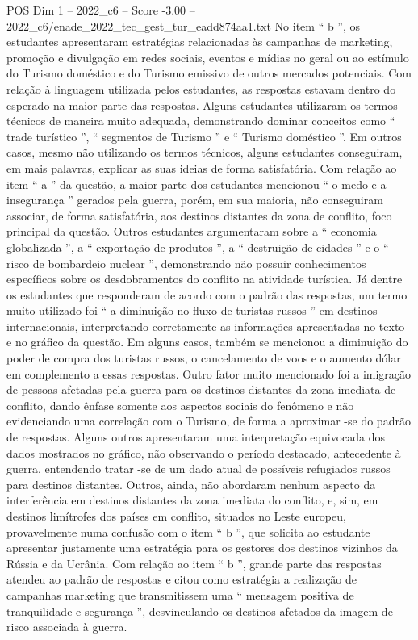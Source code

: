 \begin{textsample}{POS Dim 1 – 2022\_c6 – Score -3.00 – 2022\_c6/enade\_2022\_tec\_gest\_tur\_eadd874aa1.txt}
No item “ b ”, os estudantes apresentaram estratégias relacionadas às campanhas de marketing, promoção e divulgação em redes sociais, eventos e mídias no geral ou ao estímulo do Turismo doméstico e do Turismo emissivo de outros mercados potenciais.
Com relação à linguagem utilizada pelos estudantes, as respostas estavam dentro do esperado na maior parte das respostas.
Alguns estudantes utilizaram os termos técnicos de maneira muito adequada, demonstrando dominar conceitos como “ trade turístico ”, “ segmentos de Turismo ” e “ Turismo doméstico ”.
Em outros casos, mesmo não utilizando os termos técnicos, alguns estudantes conseguiram, em mais palavras, explicar as suas ideias de forma satisfatória.
Com relação ao item “ a ” da questão, a maior parte dos estudantes mencionou “ o medo e a insegurança ” gerados pela guerra, porém, em sua maioria, não conseguiram associar, de forma satisfatória, aos destinos distantes da zona de conflito, foco principal da questão.
Outros estudantes argumentaram sobre a “ economia globalizada ”, a “ exportação de produtos ”, a “ destruição de cidades ” e o “ risco de bombardeio nuclear ”, demonstrando não possuir conhecimentos específicos sobre os desdobramentos do conflito na atividade turística.
Já dentre os estudantes que responderam de acordo com o padrão das respostas, um termo muito utilizado foi “ a diminuição no fluxo de turistas russos ” em destinos internacionais, interpretando corretamente as informações apresentadas no texto e no gráfico da questão.
Em alguns casos, também se mencionou a diminuição do poder de compra dos turistas russos, o cancelamento de voos e o aumento dólar em complemento a essas respostas.
Outro fator muito mencionado foi a imigração de pessoas afetadas pela guerra para os destinos distantes da zona imediata de conflito, dando ênfase somente aos aspectos sociais do fenômeno e não evidenciando uma correlação com o Turismo, de forma a aproximar -se do padrão de respostas.
Alguns outros apresentaram uma interpretação equivocada dos dados mostrados no gráfico, não observando o período destacado, antecedente à guerra, entendendo tratar -se de um dado atual de possíveis refugiados russos para destinos distantes.
Outros, ainda, não abordaram nenhum aspecto da interferência em destinos distantes da zona imediata do conflito, e, sim, em destinos limítrofes dos países em conflito, situados no Leste europeu, provavelmente numa confusão com o item “ b ”, que solicita ao estudante apresentar justamente uma estratégia para os gestores dos destinos vizinhos da Rússia e da Ucrânia.
Com relação ao item “ b ”, grande parte das respostas atendeu ao padrão de respostas e citou como estratégia a realização de campanhas marketing que transmitissem uma “ mensagem positiva de tranquilidade e segurança ”, desvinculando os destinos afetados da imagem de risco associada à guerra.

\end{textsample}
